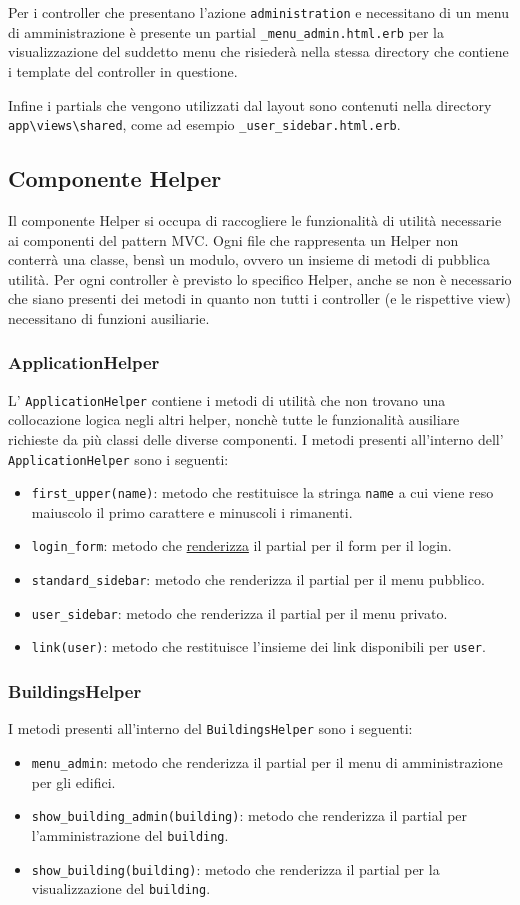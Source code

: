 \documentclass[11pt,a4paper]{article}
\begin{document}
Per i controller che presentano l'azione \verb|administration| e necessitano di un menu di amministrazione è presente un partial \verb|_menu_admin.html.erb| per la visualizzazione del suddetto menu che risiederà nella stessa directory che contiene i template del controller in questione.

Infine i partials che vengono utilizzati dal layout sono contenuti nella directory \verb|app\views\shared|, come ad esempio \verb|_user_sidebar.html.erb|.
\subsection{Componente Helper}\label{helper}
Il componente Helper si occupa di raccogliere le funzionalità di utilità necessarie ai componenti del pattern MVC. Ogni file che rappresenta un Helper non conterrà una classe, bensì un modulo, ovvero un insieme di metodi di pubblica utilità. Per ogni controller è previsto lo specifico Helper, anche se non è necessario che siano presenti dei metodi in quanto non tutti i controller (e le rispettive view) necessitano di funzioni ausiliarie.
\subsubsection{ApplicationHelper}
L' \verb|ApplicationHelper| contiene i metodi di utilità che non trovano una collocazione logica negli altri helper, nonchè tutte le funzionalità ausiliare richieste da più classi delle diverse componenti.
I metodi presenti all'interno dell' \verb|ApplicationHelper| sono i seguenti:
\begin{itemize}
 \item \verb|first_upper(name)|: metodo che restituisce la stringa \verb|name| a cui viene reso maiuscolo il primo carattere e minuscoli i rimanenti.
 \item \verb|login_form|: metodo che \underline{renderizza} il partial per il form per il login.
 \item \verb|standard_sidebar|: metodo che renderizza il partial per il menu pubblico.
 \item \verb|user_sidebar|: metodo che renderizza il partial per il menu privato.
 \item \verb|link(user)|: metodo che restituisce l'insieme dei link disponibili per \verb|user|.
\end{itemize}
\subsubsection{BuildingsHelper}
I metodi presenti all'interno del \verb|BuildingsHelper| sono i seguenti:
\begin{itemize}
 \item \verb|menu_admin|: metodo che renderizza il partial per il menu di amministrazione per gli edifici.
 \item \verb|show_building_admin(building)|: metodo che renderizza il partial per l'amministrazione del \verb|building|.
 \item \verb|show_building(building)|: metodo che renderizza il partial per la visualizzazione del \verb|building|.
\end{itemize}
\end{document}

